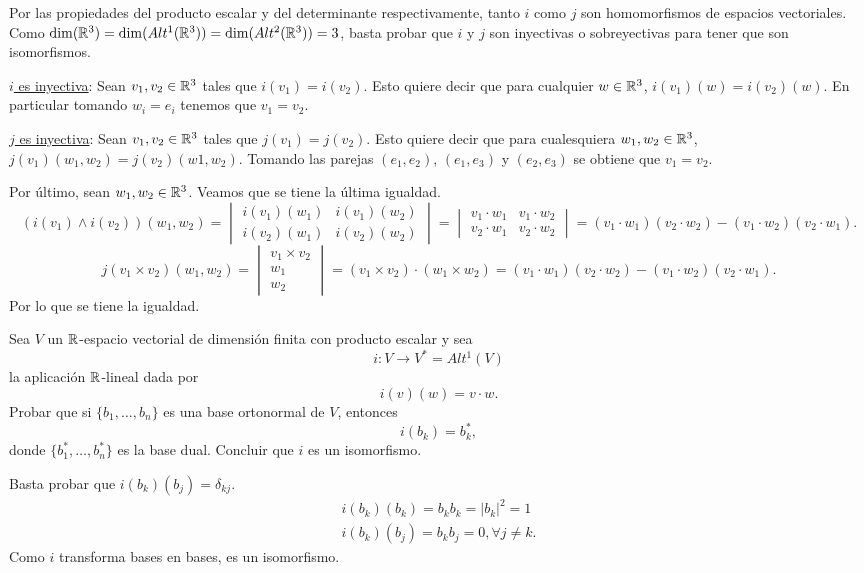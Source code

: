 \documentclass[twoside]{article}
\begin{document}
\begin{solucion}
Por las propiedades del producto escalar y del determinante respectivamente, tanto $i$ como $j$ son homomorfismos de espacios vectoriales. Como $\dim(\mathbb{R}^3)=\dim(Alt^1(\mathbb{R}^3))=\dim(Alt^2(\mathbb{R}^3))=3$, basta probar que $i$ y $j$ son inyectivas o sobreyectivas para tener que son isomorfismos.

\underline{$i$ es inyectiva}:
Sean $v_1,v_2\in\mathbb{R}^3$ tales que $i(v_1)=i(v_2)$. Esto quiere decir que para cualquier $w\in\mathbb{R}^3$, $i(v_1)(w)=i(v_2)(w)$. En particular tomando $w_i=e_i$ tenemos que $v_1=v_2$. 


\underline{$j$ es inyectiva}:
Sean $v_1,v_2\in\mathbb{R}^3$ tales que $j(v_1)=j(v_2)$. Esto quiere decir que para cualesquiera $w_1,w_2\in\mathbb{R}^3$, $j(v_1)(w_1,w_2)=j(v_2)(w1,w_2)$. Tomando las parejas $(e_1,e_2)$, $(e_1,e_3)$ y $(e_2,e_3)$ se obtiene que $v_1=v_2$. 

Por último, sean $w_1,w_2\in\mathbb{R}^3$. Veamos que se tiene la última igualdad.
$$(i(v_1)\land i(v_2))(w_1,w_2)=\begin{vmatrix}
i(v_1)(w_1) & i(v_1)(w_2)\\
i(v_2)(w_1) & i(v_2)(w_2)
\end{vmatrix}=\begin{vmatrix}
v_1\cdot w_1 & v_1\cdot w_2\\
v_2\cdot w_1 & v_2\cdot w_2
\end{vmatrix}=(v_1\cdot w_1)(v_2\cdot w_2)-(v_1\cdot w_2)(v_2\cdot w_1).$$
$$j(v_1\times v_2)(w_1,w_2)=\begin{vmatrix}
v_1\times v_2\\
w_1\\
w_2
\end{vmatrix}=(v_1\times v_2)\cdot (w_1\times w_2)=(v_1\cdot w_1)(v_2\cdot w_2)-(v_1\cdot w_2)(v_2\cdot w_1).$$
Por lo que se tiene la igualdad. 
\end{solucion}

\newpage

\begin{ejercicio}{2.4}
Sea $V$ un $\mathbb{R}$-espacio vectorial de dimensión finita con producto escalar y sea 
$$i:V\to V^*=Alt^1(V)$$
la aplicación $\mathbb{R}$-lineal dada por 
$$i(v)(w)=v\cdot w.$$
Probar que si $\{b_1,\dots, b_n\}$ es una base ortonormal de $V$, entonces
$$i(b_k)=b_k^*,$$
donde $\{b_1^*,\dots, b_n^*\}$ es la base dual. Concluir que $i$ es un isomorfismo.
\end{ejercicio}
\begin{solucion}
Basta probar que $i(b_k)(b_j)=\delta_{kj}$. 
\begin{gather*}
i(b_k)(b_k)=b_kb_k=|b_k|^2=1\\
i(b_k)(b_j)=b_kb_j=0, \forall j\neq k.
\end{gather*}
Como $i$ transforma bases en bases, es un isomorfismo.
\end{solucion}
\end{document}
